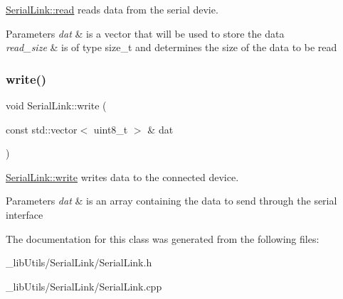 \mbox{\hyperlink{class_serial_link_a2f83d397031c69640346fd69a44364d0}{Serial\+Link\+::read}} reads data from the serial devie. 


\begin{DoxyParams}{Parameters}
{\em dat} & is a vector that will be used to store the data \\
\hline
{\em read\+\_\+size} & is of type size\+\_\+t and determines the size of the data to be read \\
\hline
\end{DoxyParams}
\mbox{\label{class_serial_link_af0e94df5c46bb1b89f2b79eda8312fde}} 
\subsubsection{\texorpdfstring{write()}{write()}}
{\footnotesize\ttfamily void Serial\+Link\+::write (\begin{DoxyParamCaption}\item[{const std\+::vector$<$ uint8\+\_\+t $>$ \&}]{dat }\end{DoxyParamCaption})}



\mbox{\hyperlink{class_serial_link_af0e94df5c46bb1b89f2b79eda8312fde}{Serial\+Link\+::write}} writes data to the connected device. 


\begin{DoxyParams}{Parameters}
{\em dat} & is an array containing the data to send through the serial interface \\
\hline
\end{DoxyParams}


The documentation for this class was generated from the following files\+:\begin{DoxyCompactItemize}
\item 
\+\_\+lib\+Utils/\+Serial\+Link/Serial\+Link.\+h\item 
\+\_\+lib\+Utils/\+Serial\+Link/Serial\+Link.\+cpp\end{DoxyCompactItemize}

